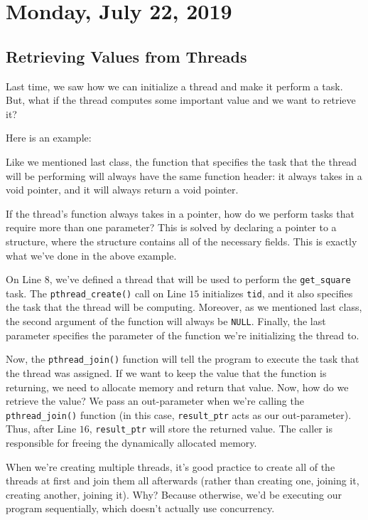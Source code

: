 \section{Monday, July 22, 2019}
\subsection{Retrieving Values from Threads}

Last time, we saw how we can initialize a thread and make it perform a task. But, what if the thread computes some important value and we want to retrieve it?

Here is an example:

\lstset{caption=Retrieving Values}
\begin{center}

\end{center}


Like we mentioned last class, the function that specifies the task that the thread will be performing will always have the same function header: it always takes in a void pointer, and it will always return a void pointer. 

If the thread's function always takes in a pointer, how do we perform tasks that require more than one parameter? This is solved by declaring a pointer to a structure, where the structure contains all of the necessary fields. This is exactly what we've done in the above example.

On Line $8$, we've defined a thread that will be used to perform the \verb!get_square! task. The \verb!pthread_create()! call on Line $15$ initializes \verb!tid!, and it also specifies the task that the thread will be computing. Moreover, as we mentioned last class, the second argument of the function will always be \verb!NULL!. Finally, the last parameter specifies the parameter of the function we're initializing the thread to.


Now, the \verb!pthread_join()! function will tell the program to execute the task that the thread was assigned. If we want to keep the value that the function is returning, we need to allocate memory and return that value. Now, how do we retrieve the value? We pass an out-parameter when we're calling the \verb!pthread_join()! function (in this case, \verb!result_ptr! acts as our out-parameter). Thus, after Line $16$, \verb!result_ptr! will store the returned value. The caller is responsible for freeing the dynamically allocated memory.

When we're creating multiple threads, it's good practice to create all of the threads at first and join them all afterwards (rather than creating one, joining it, creating another, joining it). Why? Because otherwise, we'd be executing our program sequentially, which doesn't actually use concurrency.

